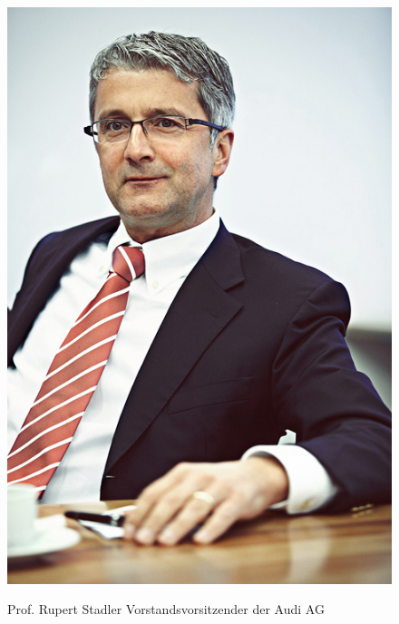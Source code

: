 \documentclass[12pt]{article}
\begin{document}
\begin{figure}[here!]
	\centering
	\begin{minipage}[h]{0.20\textwidth}
		\centering
		\includegraphics[width=1.0\textwidth]{images/RupertStadler.jpg}
		\label{fig:vorstandvw8}
		\cite{rspic}
	\end{minipage}
	\begin{minipage}[h]{0.10\textwidth}
		\hspace{1cm} 
	\end{minipage}
	\begin{minipage}[h]{0.65\textwidth}
		Prof. Rupert Stadler
		Vorstandsvorsitzender der Audi AG
	\end{minipage}
\end{figure}
\end{document}
